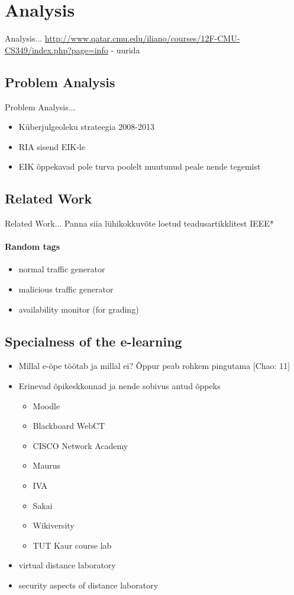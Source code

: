 \chapter{Analysis}
\label{analysis}
Analysis...
\url{http://www.qatar.cmu.edu/iliano/courses/12F-CMU-CS349/index.php?page=info} - uurida

\section{Problem Analysis}
\label{Problem Analysis}
Problem Analysis...
\begin{itemize}
	\item Küberjulgeoleku strateegia 2008-2013
	\item RIA sisend EIK-le
	\item EIK õppekavad pole turva poolelt muutunud peale nende tegemist
\end{itemize}

\section{Related Work}
\label{Related Work}
Related Work...
Panna siia lühikokkuvõte loetud teadusartikklitest IEEE*




\subsubsection{Random tags}
\begin{itemize}
	\item normal traffic generator
	\item malicious traffic generator
	\item availability monitor (for grading)
\end{itemize}

\section{Specialness of the e-learning}
\begin{itemize}
	\item Millal e-õpe töötab ja millal ei? Õppur peab rohkem pingutama [Chao: 11]
	\item Erinevad õpikeskkonnad ja nende sobivus antud õppeks
		\begin{itemize}
			\item Moodle
			\item Blackboard WebCT
			\item CISCO Network Academy
			\item Maurus
			\item IVA
			\item Sakai
			\item Wikiversity
			\item TUT Kaur course lab
		\end{itemize}
	\item virtual distance laboratory
	\item security aspects of distance laboratory
\end{itemize}


